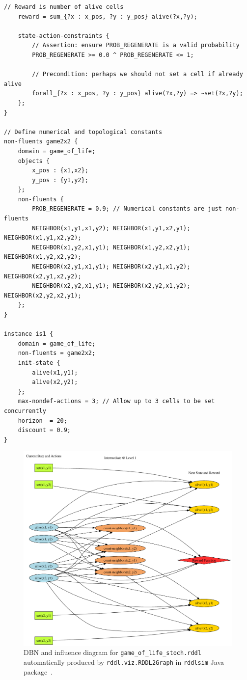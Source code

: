 \documentclass[11pt,a4paper]{article}
\begin{document}
\begin{lstlisting}[title=game\_of\_life\_stoch.rddl]
    // Reward is number of alive cells
	reward = sum_{?x : x_pos, ?y : y_pos} alive(?x,?y);
	
	state-action-constraints {
		// Assertion: ensure PROB_REGENERATE is a valid probability
		PROB_REGENERATE >= 0.0 ^ PROB_REGENERATE <= 1; 
		
		// Precondition: perhaps we should not set a cell if already alive
		forall_{?x : x_pos, ?y : y_pos} alive(?x,?y) => ~set(?x,?y);
	};
}

// Define numerical and topological constants   
non-fluents game2x2 {
	domain = game_of_life;
	objects { 
		x_pos : {x1,x2};
		y_pos : {y1,y2};
	};
	non-fluents { 
		PROB_REGENERATE = 0.9; // Numerical constants are just non-fluents
		NEIGHBOR(x1,y1,x1,y2); NEIGHBOR(x1,y1,x2,y1); NEIGHBOR(x1,y1,x2,y2);
		NEIGHBOR(x1,y2,x1,y1); NEIGHBOR(x1,y2,x2,y1); NEIGHBOR(x1,y2,x2,y2);
		NEIGHBOR(x2,y1,x1,y1); NEIGHBOR(x2,y1,x1,y2); NEIGHBOR(x2,y1,x2,y2);
		NEIGHBOR(x2,y2,x1,y1); NEIGHBOR(x2,y2,x1,y2); NEIGHBOR(x2,y2,x2,y1);
	};
}
        
instance is1 {
	domain = game_of_life;	
	non-fluents = game2x2;
	init-state { 
		alive(x1,y1); 
		alive(x2,y2); 
	};
	max-nondef-actions = 3; // Allow up to 3 cells to be set concurrently
	horizon  = 20;
	discount = 0.9;
}
\end{lstlisting}

\begin{figure}[t!]
\hspace{-5mm} \includegraphics[scale=.81]{game_of_life2.pdf}
\caption{DBN and influence diagram 
for \texttt{game\_of\_life\_stoch.rddl} automatically
produced by \texttt{rddl.viz.RDDL2Graph} in \texttt{rddlsim} Java 
package~\cite{rddlsim}.}
\label{fig:rddl3}
\end{figure}
\end{document}
